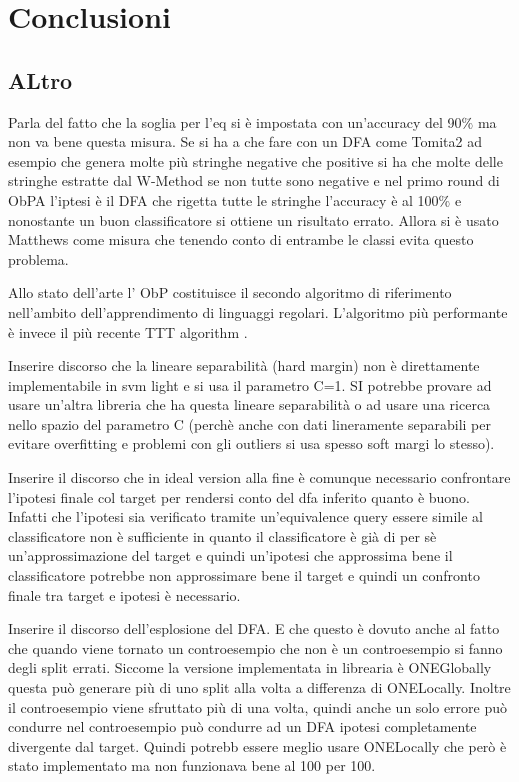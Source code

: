 \chapter*{Conclusioni}
\label{cap:con}




\section{ALtro}
Parla del fatto che la soglia per l'eq si è impostata con un'accuracy del 90$\%$ ma non va bene questa misura. Se si ha a che fare con un \ac{DFA} come Tomita2 ad esempio che genera molte più stringhe negative che positive si ha che molte delle stringhe estratte dal W-Method se non tutte sono negative e nel primo round di \ac{ObPA} l'iptesi è il DFA che rigetta tutte le stringhe l'accuracy è al 100$\%$ e nonostante un buon classificatore si ottiene un risultato errato. Allora si è usato Matthews come misura che tenendo conto di entrambe le classi evita questo problema.

Allo stato dell'arte l' \ac{ObP} costituisce il secondo algoritmo di riferimento nell'ambito dell'apprendimento di linguaggi regolari.  L'algoritmo più performante è invece il più recente TTT algorithm \cite{SteffenTTT14}.

Inserire discorso che la lineare separabilità (hard margin) non è direttamente implementabile in svm light e si usa il parametro C=1. SI potrebbe provare ad usare un'altra libreria che ha questa lineare separabilità  o ad usare una ricerca nello spazio del parametro C (perchè anche con dati lineramente separabili per evitare overfitting e problemi con gli outliers si usa spesso soft margi lo stesso).

Inserire il discorso che in ideal version alla fine è comunque necessario confrontare l'ipotesi finale col target per rendersi conto del dfa inferito quanto è buono. Infatti che l'ipotesi sia verificato tramite un'equivalence query essere simile al classificatore non è sufficiente in quanto il classificatore è già di per sè un'approssimazione del target e quindi un'ipotesi che approssima bene il classificatore potrebbe non approssimare bene il target e quindi un confronto finale tra target e ipotesi è necessario. 

Inserire il discorso dell'esplosione del DFA. E che questo è dovuto anche al fatto che quando viene tornato un controesempio che non è un controesempio si fanno degli split errati. Siccome la versione implementata in librearia è ONEGlobally questa può generare più di uno split alla volta a differenza di ONELocally. Inoltre il controesempio viene sfruttato più di una volta, quindi anche un solo errore può condurre nel controesempio può condurre ad un DFA ipotesi completamente divergente dal target. Quindi potrebb essere meglio usare ONELocally che però è stato implementato ma non funzionava bene al 100 per 100.


